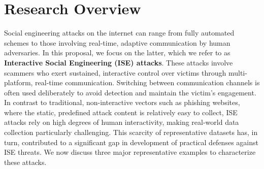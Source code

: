 \section{Research Overview}
\label{sec:overview}


Social engineering attacks on the internet can range from fully automated schemes to those involving real-time, adaptive communication by human adversaries. In this proposal, we focus on the latter, which we refer to as \textbf{Interactive Social Engineering (ISE) attacks}. These attacks involve scammers who exert sustained, interactive control over victims through multi-platform, real-time communication. Switching between communication channels is often used deliberately to avoid detection and maintain the victim's engagement. In contrast to traditional, non-interactive vectors such as phishing websites, where the static, predefined attack content is relatively easy to collect, ISE attacks rely on high degrees of human interactivity, making real-world data collection particularly challenging. This scarcity of representative datasets has, in turn, contributed to a significant gap in development of practical defenses against ISE threats. We now discuss three major representative examples to characterize these attacks.

